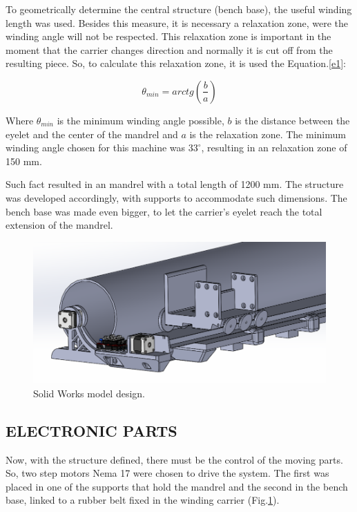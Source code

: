 \documentclass[10pt,fleqn,a4paper,twoside]{article}
\begin{document}
To geometrically determine the central structure (bench base), the useful winding length was used. Besides this measure, it is necessary a relaxation zone, were the winding angle will not be respected. This relaxation zone is important in the moment that the carrier changes direction \citep{livro_prof} and normally it is cut off from the resulting piece. So, to calculate this relaxation zone, it is used the Equation.\ref{e1}:

\begin{equation}\label{e1}
\theta_{min} = arctg \left(\frac{b}{a}\right)
\end{equation}

Where $\theta_{min}$ is the minimum winding angle possible, $b$ is the distance between the eyelet and the center of the mandrel and $a$ is the relaxation zone. The minimum winding angle chosen for this machine was $33^\circ$, resulting in an relaxation zone of 150 mm.

Such fact resulted in an mandrel with a total length of 1200 mm. The structure was developed accordingly, with supports to accommodate such dimensions. The bench base was made even bigger, to let the carrier's eyelet reach the total extension of the mandrel.  



\begin{figure}[!h]
\centering
\includegraphics[angle=0, trim = {0mm 0mm 30mm 10mm}, clip , scale=0.3]{imagens/cad}
\caption{Solid Works model design.}
\label{i5}
\end{figure}




\subsection{ELECTRONIC PARTS}

Now, with the structure defined, there must be the control of the moving parts. So, two step motors Nema 17 were chosen to drive the system. The first was placed in one of the supports that hold the mandrel and the second in the bench base, linked to a rubber belt fixed in the winding carrier (Fig.\ref{i5}).
\end{document}
